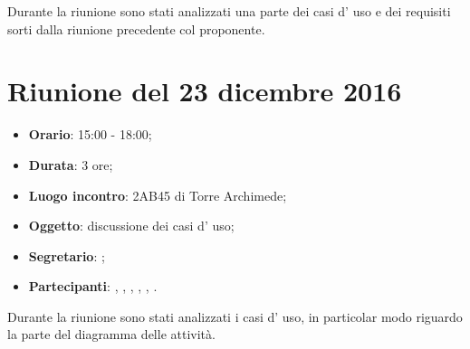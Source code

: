 Durante la riunione sono stati analizzati una parte dei casi d' uso e dei requisiti sorti dalla riunione precedente col proponente.


\section{Riunione del 23 dicembre 2016}

\begin{itemize}
	\item \textbf{Orario}: 15:00 - 18:00;
	\item \textbf{Durata}: 3 ore;
	\item \textbf{Luogo incontro}: 2AB45 di Torre Archimede; 
	\item \textbf{Oggetto}: discussione dei casi d' uso;
	\item \textbf{Segretario}: \PB; 
	\item \textbf{Partecipanti}: \AZ, \GG, \LB, \LS, \MM, \PB.
\end{itemize}

Durante la riunione sono stati analizzati i casi d' uso, in particolar modo riguardo la parte del diagramma delle attività.

